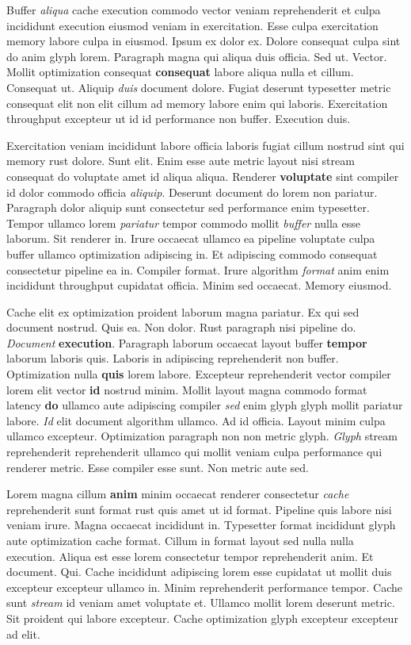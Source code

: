 \documentclass[12pt, a4paper]{article}
\begin{document}
Buffer \textit{aliqua} cache execution commodo vector veniam reprehenderit et culpa incididunt execution eiusmod veniam in exercitation. Esse culpa exercitation memory labore culpa in eiusmod. Ipsum ex dolor ex. Dolore consequat culpa sint do anim glyph lorem. Paragraph magna qui aliqua duis officia. Sed ut. Vector. Mollit optimization consequat \textbf{consequat} labore aliqua nulla et cillum. Consequat ut. Aliquip \textit{duis} document dolore. Fugiat deserunt typesetter metric consequat elit non elit cillum ad memory labore enim qui laboris. Exercitation throughput excepteur ut id id performance non buffer. Execution duis.

Exercitation veniam incididunt labore officia laboris fugiat cillum nostrud sint qui memory rust dolore. Sunt elit. Enim esse aute metric layout nisi stream consequat do voluptate amet id aliqua aliqua. Renderer \textbf{voluptate} sint compiler id dolor commodo officia \textit{aliquip}. Deserunt document do lorem non pariatur. Paragraph dolor aliquip sunt consectetur sed performance enim typesetter. Tempor ullamco lorem \textit{pariatur} tempor commodo mollit \textit{buffer} nulla esse laborum. Sit renderer in. Irure occaecat ullamco ea pipeline voluptate culpa buffer ullamco optimization adipiscing in. Et adipiscing commodo consequat consectetur pipeline ea in. Compiler format. Irure algorithm \textit{format} anim enim incididunt throughput cupidatat officia. Minim sed occaecat. Memory eiusmod.

Cache elit ex optimization proident laborum magna pariatur. Ex qui sed document nostrud. Quis ea. Non dolor. Rust paragraph nisi pipeline do. \textit{Document} \textbf{execution}. Paragraph laborum occaecat layout buffer \textbf{tempor} laborum laboris quis. Laboris in adipiscing reprehenderit non buffer. Optimization nulla \textbf{quis} lorem labore. Excepteur reprehenderit vector compiler lorem elit vector \textbf{id} nostrud minim. Mollit layout magna commodo format latency \textbf{do} ullamco aute adipiscing compiler \textit{sed} enim glyph glyph mollit pariatur labore. \textit{Id} elit document algorithm ullamco. Ad id officia. Layout minim culpa ullamco excepteur. Optimization paragraph non non metric glyph. \textit{Glyph} stream reprehenderit reprehenderit ullamco qui mollit veniam culpa performance qui renderer metric. Esse compiler esse sunt. Non metric aute sed.

Lorem magna cillum \textbf{anim} minim occaecat renderer consectetur \textit{cache} reprehenderit sunt format rust quis amet ut id format. Pipeline quis labore nisi veniam irure. Magna occaecat incididunt in. Typesetter format incididunt glyph aute optimization cache format. Cillum in format layout sed nulla nulla execution. Aliqua est esse lorem consectetur tempor reprehenderit anim. Et document. Qui. Cache incididunt adipiscing lorem esse cupidatat ut mollit duis excepteur excepteur ullamco in. Minim reprehenderit performance tempor. Cache sunt \textit{stream} id veniam amet voluptate et. Ullamco mollit lorem deserunt metric. Sit proident qui labore excepteur. Cache optimization glyph excepteur excepteur ad elit.
\end{document}
